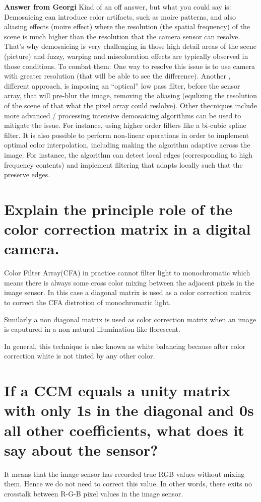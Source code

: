 \documentclass{article}
\begin{document}
\textbf{Answer from Georgi} Kind of an off answer, but what you could say is: Demosaicing can introduce color artifacts, such as moire patterns, and also aliasing 
effects (moire effect) where the resolution (the spatial frequency) of the scene is much 
higher than the resolution that the camera sensor can resolve. That's why demosaicing 
is very challenging in those high detail areas of the scene (picture) and fuzzy, warping 
and miscoloration effects are typically observed in those conditions. To combat them:
One way to resolve this issue is to use camera with greater resolution (that will be 
able to see the difference). Another , different approach, is imposing an “optical” 
low pass filter, before the sensor array, that will pre-blur the image, removing the 
aliasing (equlizing the resolution of the scene of that what the pixel array could 
reslolve). Other thecniques include more advanced / processing intensive demosaicing 
algorithms can be used to mitigate the issue. For instance, using higher order filters 
like a bi-cubic spline filter. It is also possible to perform non-linear operations in 
order to implement optimal color interpolation, including making the algorithm adaptive
across the image. For instance, the algorithm can detect local edges (corresponding to 
high frequency contents) and implement filtering that adapts locally such that the 
preserve edges.

\section{Explain the principle role of the color correction matrix in a digital 
camera.}
Color Filter Array(CFA) in practice cannot filter light to  monochromatic which 
means there is always some cross color mixing between the adjacent pixels in the image 
sensor. In this case a diagonal matrix is used as a color correction matrix to 
correct the CFA distrotion of monochromatic light.\newline

\noindent Similarly a non diagonal matrix is used as color correction matrix when an image 
is caputured in a non natural illumination like florescent.\newline

\noindent In general, this technique is also known as white balancing because after color 
correction white is not tinted by any other color.

\section{If a CCM equals a unity matrix with only 1s in the diagonal and 0s 
all other coefficients, what does it say about the sensor?}
It means that the image sensor has recorded true RGB values without mixing them. Hence we do 
not need to correct this value. In other words, there exits no crosstalk between R-G-B 
pixel values in the image sensor.
\end{document}
